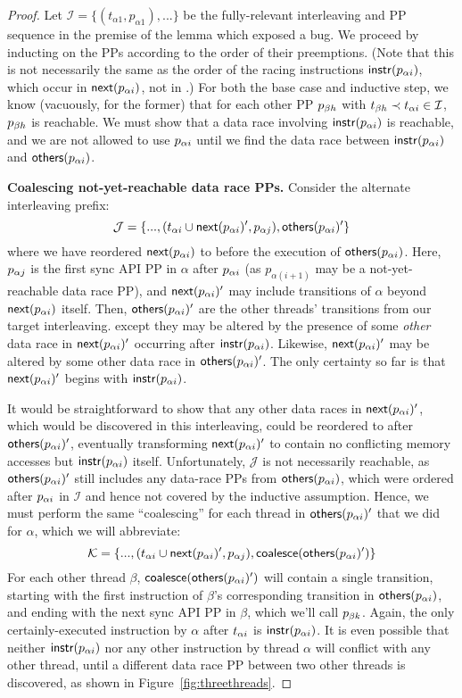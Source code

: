 \begin{proof}
Let $\mathcal{I} = \{(t_{\alpha{}1}, p_{\alpha{}1}), ...\}$ be the fully-relevant interleaving and PP sequence in the premise of the lemma which exposed a bug.
We proceed by inducting on the PPs according to the order of their preemptions.
(Note that this is not necessarily the same as the order of the racing instructions $\mathsf{instr}(p_{\alpha{}i})$, which occur in $\mathsf{next}(p_{\alpha{}i})$, not in \tai.)
For both the base case and inductive step, we know (vacuously, for the former) that for each other PP $p_{\beta{}h}$ with $t_{\beta{}h} \prec t_{\alpha{}i} \in \mathcal{I}$, $p_{\beta{}h}$ is reachable.
We must show that a data race involving $\mathsf{instr}(p_{\alpha{}i})$
is reachable, and we are not allowed to use $p_{\alpha{}i}$ until we find the data race between $\mathsf{instr}(p_{\alpha{}i})$ and $\mathsf{others}(p_{\alpha{}i})$.

{\bf Coalescing not-yet-reachable data race PPs.}
Consider the alternate interleaving prefix:
\[
	\mathcal{J} = \{..., (t_{\alpha{}i} \cup \mathsf{next}(p_{\alpha{}i})', p_{\alpha{}j}), \mathsf{others}(p_{\alpha{}i})' \}
\]
where we have reordered $\mathsf{next}(p_{\alpha{}i})$ to before the execution of $\mathsf{others}(p_{\alpha{}i})$.
Here, $p_{\alpha{}j}$ is the first sync API PP in $\alpha$ after $p_{\alpha{}i}$ (as $p_{\alpha(i+1)}$ may be a not-yet-reachable data race PP),
and $\mathsf{next}(p_{\alpha{}i})'$ may include transitions of $\alpha$ beyond $\mathsf{next}(p_{\alpha{}i})$ itself.
Then, $\mathsf{others}(p_{\alpha{}i})'$ are the other threads' transitions from our target interleaving.
except they may be altered by the presence of some {\em other} data race in $\mathsf{next}(p_{\alpha{}i})'$ occurring after $\mathsf{instr}(p_{\alpha{}i})$.
Likewise, $\mathsf{next}(p_{\alpha{}i})'$ may be altered by some other data race in $\mathsf{others}(p_{\alpha{}i})'$.
The only certainty so far is that $\mathsf{next}(p_{\alpha{}i})'$ begins with $\mathsf{instr}(p_{\alpha{}i})$.

It would be straightforward to show that any other data races in $\mathsf{next}(p_{\alpha{}i})'$, which would be discovered in this interleaving,
could be reordered to after $\mathsf{others}(p_{\alpha{}i})'$,
eventually transforming $\mathsf{next}(p_{\alpha{}i})'$ to contain no conflicting memory accesses but $\mathsf{instr}(p_{\alpha{}i})$ itself.
Unfortunately, $\mathcal{J}$ is not necessarily reachable, as $\mathsf{others}(p_{\alpha{}i})'$ still includes any data-race PPs from $\mathsf{others}(p_{\alpha{}i})$,
which were ordered after $p_{\alpha{}i}$ in $\mathcal{I}$ and hence not covered by the inductive assumption.
Hence, we must perform the same ``coalescing'' for each thread in $\mathsf{others}(p_{\alpha{}i})'$ that we did for $\alpha$,
which we will abbreviate:
\[
	\mathcal{K} = \{..., (t_{\alpha{}i} \cup \mathsf{next}(p_{\alpha{}i})', p_{\alpha{}j}), \mathsf{coalesce}(\mathsf{others}(p_{\alpha{}i})') \}
\]
For each other thread $\beta$, $\mathsf{coalesce}(\mathsf{others}(p_{\alpha{}i})')$ will contain a single transition,
starting with the first instruction of $\beta$'s corresponding transition in $\mathsf{others}(p_{\alpha{}i})$,
and ending with the next sync API PP in $\beta$, which we'll call $p_{\beta{}k}$.
Again, the only certainly-executed instruction by $\alpha$ after $t_{\alpha{}i}$ is $\mathsf{instr}(p_{\alpha{}i})$.
It is even possible that neither $\mathsf{instr}(p_{\alpha{}i})$ nor any other instruction by thread $\alpha$ will conflict with any other thread,
until a different data race PP between two other threads is discovered,
as shown in Figure~\ref{fig:threethreads}.


\end{proof}
